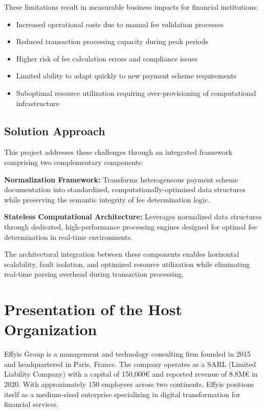 These limitations result in measurable business impacts for financial institutions:

\begin{itemize}
   \item Increased operational costs due to manual fee validation processes
   \item Reduced transaction processing capacity during peak periods
   \item Higher risk of fee calculation errors and compliance issues
   \item Limited ability to adapt quickly to new payment scheme requirements
   \item Suboptimal resource utilization requiring over-provisioning of computational infrastructure
\end{itemize}

\subsection{Solution Approach}

This project addresses these challenges through an integrated framework comprising two complementary components:

\textbf{Normalization Framework:} Transforms heterogeneous payment scheme documentation into standardized, computationally-optimized data structures while preserving the semantic integrity of fee determination logic.

\textbf{Stateless Computational Architecture:} Leverages normalized data structures through dedicated, high-performance processing engines designed for optimal fee determination in real-time environments.

The architectural integration between these components enables horizontal scalability, fault isolation, and optimized resource utilization while eliminating real-time parsing overhead during transaction processing.

\section{Presentation of the Host Organization}

Effyis Group is a management and technology consulting firm founded in 2015 and headquartered in Paris, France. The company operates as a SARL (Limited Liability Company) with a capital of 150,000€ and reported revenue of 8.8M€ in 2020. With approximately 150 employees across two continents, Effyis positions itself as a medium-sized enterprise specializing in digital transformation for financial services.

